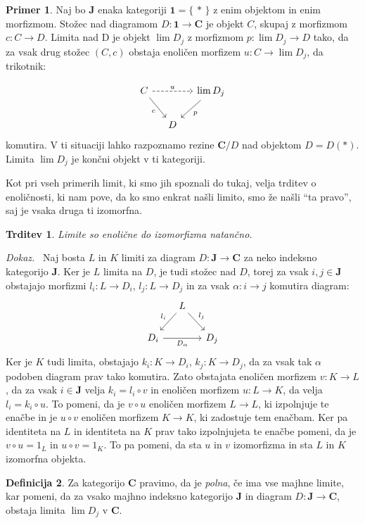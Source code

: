\documentclass[12pt,a4paper]{book}
\theoremstyle{definition}
\newtheorem{definicija}{Definicija}[chapter]
\theoremstyle{plain}
\newtheorem{trditev}[definicija]{Trditev}
\newenvironment{dokaz}{\emph{Dokaz.}\ }{\hspace{\fill}{$\Box$}}
\theoremstyle{definition}
\newtheorem{primer}{Primer}[section]
\theoremstyle{remark}
\newcommand{\cat}[1]{\textbf{#1}}
\renewcommand{\set}[1]{\{\,#1\,\}}
\begin{document}
\begin{primer}
Naj bo $\cat{J}$ enaka kategoriji $\cat{1} = \set{\ast}$ z enim objektom in enim morfizmom. Stožec nad diagramom $D : \cat{1} \to \cat{C}$ je objekt $C$, skupaj z morfizmom $c : C \to D$. Limita nad D je objekt $\lim D_j$ z morfizmom $p : \lim D_j \to D$ tako, da za vsak drug stožec $(C, c)$ obstaja enoličen morfizem $u : C \to \lim D_j$, da trikotnik:

$$\begin{tikzcd}[column sep=small]
C \ar[dr, "c"'] \ar[rr, dashed, "u"] & & \lim D_j \ar[dl, "p"] \\
& D &
\end{tikzcd}$$
komutira. V ti situaciji lahko razpoznamo rezine $\cat{C}/D$ nad objektom $D = D(\ast)$. Limita $\lim D_j$ je končni objekt v ti kategoriji.
\end{primer}
%
Kot pri vseh primerih limit, ki smo jih spoznali do tukaj, velja trditev o enoličnosti, ki nam pove, da ko smo enkrat našli limito, smo že našli "`ta pravo"', saj je vsaka druga ti izomorfna.
%
\begin{trditev}
Limite so enolične do izomorfizma natančno.
\end{trditev}
\begin{dokaz}
Naj bosta $L$ in $K$ limiti za diagram $D : \cat{J} \to \cat{C}$ za neko indeksno kategorijo $\cat{J}$. Ker je $L$ limita na $D$, je tudi stožec nad $D$, torej za vsak $i,j \in \cat{J}$ obstajajo morfizmi $l_i : L \to D_i$, $l_j: L \to D_j$ in za vsak $\alpha : i \to j$ komutira diagram:
$$
\begin{tikzcd}[column sep=small]
& L \ar[dl, "l_i"'] \ar[dr, "l_j"] & \\
D_i \ar[rr, "D_\alpha"'] & & D_j
\end{tikzcd}
$$
Ker je $K$ tudi limita, obstajajo $k_i : K \to D_i$, $k_j : K \to D_j$, da za vsak tak $\alpha$ podoben diagram prav tako komutira. Zato obstajata enoličen morfizem $v : K \to L$, da za vsak $i \in \cat{J}$ velja $k_i = l_i \circ v$ in enoličen morfizem $u: L \to K$, da velja $l_i = k_i \circ u$. To pomeni, da je $v \circ u$ enoličen morfizem $L \to L$, ki izpolnjuje te enačbe in je $u \circ v$ enoličen morfizem $K \to K$, ki zadostuje tem enačbam. Ker pa identiteta na $L$ in identiteta na $K$ prav tako izpolnjujeta te enačbe pomeni, da je $v \circ u = 1_L$ in $u \circ v = 1_K$. To pa pomeni, da sta $u$ in $v$ izomorfizma in sta $L$ in $K$ izomorfna objekta.
\end{dokaz}

\begin{definicija}
Za kategorijo $\cat{C}$ pravimo, da je \emph{polna}, če ima vse majhne limite, kar pomeni, da za vsako majhno indeksno kategorijo $\cat{J}$ in diagram $D : \cat{J} \to \cat{C}$, obstaja limita $\lim D_j$ v $\cat{C}$.
\end{definicija}
\end{document}
